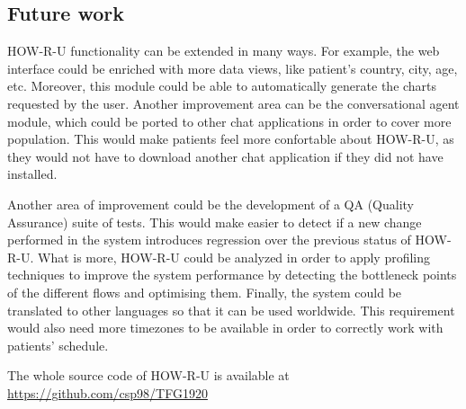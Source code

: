 \documentclass[12pt,english]{article}
\begin{document}
\subsection{Future work}

HOW-R-U functionality can be extended in many ways. For example, the web interface could be enriched with more data views, like patient's country, city, age, etc. Moreover, this module could be able to automatically generate the charts requested by the user. Another improvement area can be the conversational agent module, which could be ported to other chat applications in order to cover more population. This would make patients feel more confortable about HOW-R-U, as they would not have to download another chat application if they did not have \cite{Telegram} installed.


Another area of improvement could be the development of a QA (Quality Assurance) suite of tests. This would make easier to detect if a new change performed in the system introduces regression over the previous status of HOW-R-U. What is more, HOW-R-U could be analyzed in order to apply profiling techniques to improve the system performance by detecting the bottleneck points of the different flows and optimising them. Finally, the system could be translated to other languages so that it can be used worldwide. This requirement would also need more timezones to be available in order to correctly work with patients' schedule.
\vspace{1cm}

The whole source code of HOW-R-U is available at \href{https://github.com/csp98/TFG1920}{https://github.com/csp98/TFG1920}

\newpage


\doclicenseThis
\end{document}
